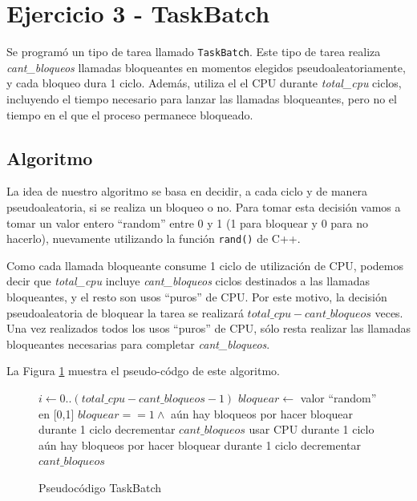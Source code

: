 \section{Ejercicio 3 - TaskBatch}

Se programó un tipo de tarea llamado {\tt TaskBatch}.  Este tipo de tarea realiza {\it cant_bloqueos} llamadas bloqueantes en momentos elegidos pseudoaleatoriamente, y cada bloqueo dura 1 ciclo.  Además, utiliza el el CPU durante {\it total_cpu} ciclos, incluyendo el tiempo necesario para lanzar las llamadas bloqueantes, pero no el tiempo en el que el proceso permanece bloqueado.

\subsection{Algoritmo}

La idea de nuestro algoritmo se basa en decidir, a cada ciclo y de manera pseudoaleatoria, si se realiza un bloqueo o no.  Para tomar esta decisión vamos a tomar un valor entero ``random'' entre 0 y 1 (1 para bloquear y 0 para no hacerlo), nuevamente utilizando la función {\tt rand()} de C++.

Como cada llamada bloqueante consume 1 ciclo de utilización de CPU, podemos decir que {\it total_cpu} incluye {\it cant_bloqueos} ciclos destinados a las llamadas bloqueantes, y el resto son usos ``puros'' de CPU.  Por este motivo, la decisión pseudoaleatoria de bloquear la tarea se realizará $total\_cpu - cant\_bloqueos$ veces. Una vez realizados todos los usos ``puros'' de CPU, sólo resta realizar las llamadas bloqueantes necesarias para completar {\it cant_bloqueos}.

La Figura \ref{cod-tbatch} muestra el pseudo-códgo de este algoritmo.

\begin{figure}[!htb]
\begin{codebox}
\li \For $i \leftarrow 0 .. (total\_cpu - cant\_bloqueos - 1)$
\li \Do 	$bloquear \leftarrow $ valor ``random'' en [0,1]
\li 		\If $bloquear == 1 \wedge $ aún hay bloqueos por hacer
\li 		\Then 	bloquear durante 1 ciclo
\li	 			decrementar $cant\_bloqueos$
\li 		\Else	usar CPU durante 1 ciclo
		\End
	\End
\li \While aún hay bloqueos por hacer
\li \Do 		bloquear durante 1 ciclo
\li 			decrementar $cant\_bloqueos$
	\End
\end{codebox}
\caption{Pseudocódigo TaskBatch}\label{cod-tbatch}
\end{figure}

